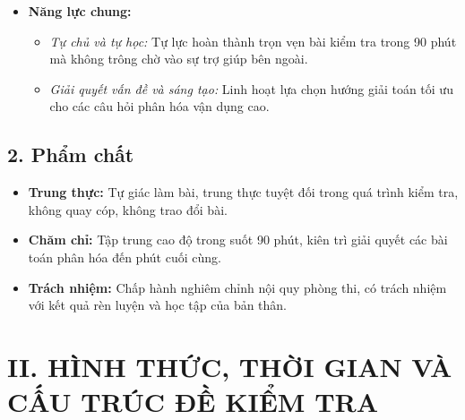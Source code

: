 \documentclass[12pt, a4paper]{article}
\begin{document}
\begin{itemize}[leftmargin=1.2cm]
    \item \textbf{Năng lực chung:}
    \begin{itemize}[leftmargin=0.6cm]
        \item \textit{Tự chủ và tự học:} Tự lực hoàn thành trọn vẹn bài kiểm tra trong 90 phút mà không trông chờ vào sự trợ giúp bên ngoài.
        \item \textit{Giải quyết vấn đề và sáng tạo:} Linh hoạt lựa chọn hướng giải toán tối ưu cho các câu hỏi phân hóa vận dụng cao.
    \end{itemize}
\end{itemize}

\subsection*{2. Phẩm chất}

\begin{itemize}[leftmargin=1.2cm]
    \item \textbf{Trung thực:} Tự giác làm bài, trung thực tuyệt đối trong quá trình kiểm tra, không quay cóp, không trao đổi bài.
    \item \textbf{Chăm chỉ:} Tập trung cao độ trong suốt 90 phút, kiên trì giải quyết các bài toán phân hóa đến phút cuối cùng.
    \item \textbf{Trách nhiệm:} Chấp hành nghiêm chỉnh nội quy phòng thi, có trách nhiệm với kết quả rèn luyện và học tập của bản thân.
\end{itemize}

\section*{II. HÌNH THỨC, THỜI GIAN VÀ CẤU TRÚC ĐỀ KIỂM TRA}
\end{document}
